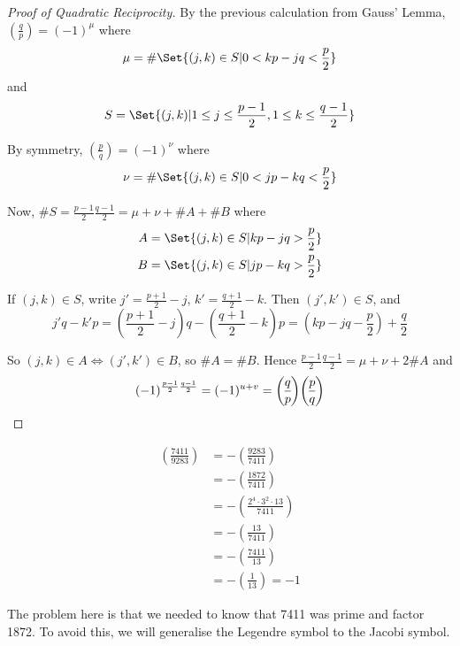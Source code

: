 \documentclass{article}
\newcommand{\legendre}[2]{\genfrac{(}{)}{}{}{#1}{#2}}
\begin{document}
\begin{proof}[Proof of Quadratic Reciprocity]
    By the previous calculation from Gauss' Lemma, $\legendre{q}{p} = (-1)^\mu$
    where
    \begin{equation*}
        \mu =\#\Set{(j, k) \in S | 0 < kp - jq < \frac{p}{2}}
    \end{equation*}
    and
    \begin{equation*}
        S = \Set{(j, k) | 1 \leq j \leq \frac{p-1}{2}, 1 \leq k \leq \frac{q-1}{2}}
    \end{equation*}

    By symmetry, $\legendre{p}{q} = (-1)^\nu$ where
    \begin{equation*}
        \nu =\#\Set{(j, k) \in S | 0 < jp - kq < \frac{p}{2}}
    \end{equation*}

    Now, $\#S = \frac{p-1}{2} \frac{q-1}{2} = \mu + \nu + \#A + \#B$ where
    \begin{align*}
        A = \Set{(j, k) \in S | kp - jq > \frac{p}{2}} \\
        B = \Set{(j, k) \in S | jp - kq > \frac{p}{2}}
    \end{align*}

    If $(j, k) \in S$, write $j' = \frac{p+1}{2} - j$, $k' = \frac{q+1}{2} - k$.
    Then $(j', k') \in S$, and
    \begin{equation*}
        j'q - k'p = \left(\frac{p+1}{2} - j\right) q - \left(\frac{q+1}{2} - k\right) p = \left(kp - jq - \frac{p}{2}\right) + \frac{q}{2}
    \end{equation*}

    So $(j, k) \in A \iff (j', k') \in B$, so $\#A = \#B$.
    Hence $\frac{p-1}{2} \frac{q-1}{2} = \mu + \nu + 2 \#A$ and
    \begin{equation*}
        (-1)^{\frac{p-1}{2} \frac{q-1}{2}} = (-1)^{u+v} = \legendre{q}{p} \legendre{p}{q}\qedhere
    \end{equation*}
\end{proof}

\begin{eg}
    \begin{align*}
        \legendre{7411}{9283} &= -\legendre{9283}{7411} \\
                              &= -\legendre{1872}{7411} \\
                              &= -\legendre{2^4 \cdot 3^2 \cdot 13}{7411} \\
                              &= -\legendre{13}{7411} \\
                              &= -\legendre{7411}{13} \\
                              &= -\legendre{1}{13} = -1
    \end{align*}

    The problem here is that we needed to know that 7411 was prime and factor 1872.
    To avoid this, we will generalise the Legendre symbol to the Jacobi symbol.
\end{eg}
\end{document}

